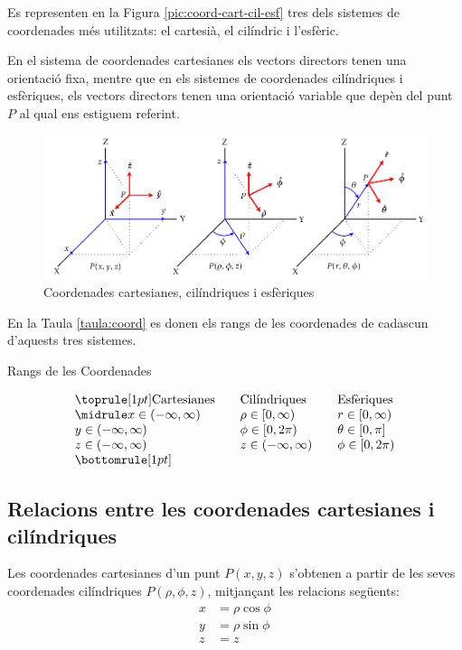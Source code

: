 \documentclass[catalan,a4paper,twoside,11pt]{article}
\begin{document}
Es representen en la Figura \vref{pic:coord-cart-cil-esf} tres dels
sistemes de coordenades més utilitzats: el cartesià, el
cilíndric i l'esfèric.

En el sistema de coordenades cartesianes els vectors directors
tenen una orientació fixa, mentre que en els sistemes de
coordenades cilíndriques i esfèriques, els vectors
directors tenen una orientació variable que depèn del punt
$P$ al qual ens estiguem referint.


\begin{figure}[h]
\centering
   \includegraphics{Imatges/Coordenades.pdf}
\caption{Coordenades cartesianes, cilíndriques i esfèriques}
\label{pic:coord-cart-cil-esf}
\end{figure}

\pagebreak
En la Taula \vref{taula:coord} es donen els rangs de les coordenades de cadascun d'aquests tres sistemes.
\begin{table}[htb]
   \caption{\label{taula:coord}Rangs de les Coordenades}
   \[ \begin{array}{lllll}
   \toprule[1pt]
   \text{Cartesianes} &  & \text{Cilíndriques} & & \text{Esfèriques}
   \\
   \midrule
      x\in(-\infty,\infty) &   & \rho\in[0,\infty)    &  &  r\in[0,\infty)  \\
      y\in(-\infty,\infty) &   & \phi\in[0,2\pi)   &  &  \theta\in[0,\pi] \\
      z\in(-\infty,\infty) &   & z\in(-\infty,\infty) &  &  \phi\in[0,2\pi) \\
   \bottomrule[1pt]
   \end{array}   \]
\end{table}

\subsection{Relacions entre les coordenades cartesianes i
cilíndriques}

Les coordenades cartesianes  d'un punt $P(x,y,z)$ s'obtenen a partir
de les seves coordenades cilíndriques $P(\rho,\phi,z)$,
mitjançant les relacions següents:
\begin{subequations}\begin{align}
    x &=\rho\cos\phi \\ y &=\rho\sin\phi \\ z &=z
\end{align}\end{subequations}
\end{document}
